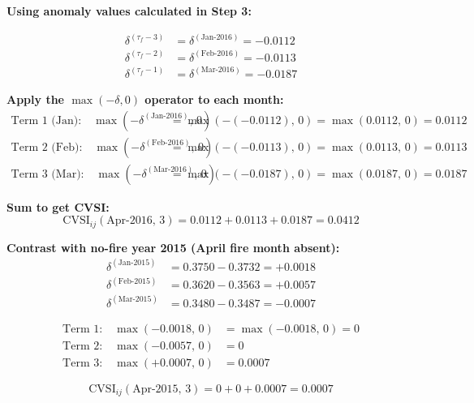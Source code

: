 \documentclass[12pt, a4paper]{article}
\begin{document}
\textbf{Using anomaly values calculated in Step 3:}

\begin{align}
\delta^{(\tau_f - 3)} &= \delta^{(\text{Jan-2016})} = -0.0112
\label{eq:d_jan16}\\
\delta^{(\tau_f - 2)} &= \delta^{(\text{Feb-2016})} = -0.0113
\label{eq:d_feb16}\\
\delta^{(\tau_f - 1)} &= \delta^{(\text{Mar-2016})} = -0.0187
\label{eq:d_mar16}
\end{align}

\textbf{Apply the $\max(-\delta, 0)$ operator to each month:}
\begin{align}
\text{Term 1 (Jan):} \quad
\max(-\delta^{(\text{Jan-2016})},\,0) &=
\max(-(-0.0112),\,0) = \max(0.0112,\,0) = \mathbf{0.0112}
\label{eq:cvsi_t1}\\[4pt]
\text{Term 2 (Feb):} \quad
\max(-\delta^{(\text{Feb-2016})},\,0) &=
\max(-(-0.0113),\,0) = \max(0.0113,\,0) = \mathbf{0.0113}
\label{eq:cvsi_t2}\\[4pt]
\text{Term 3 (Mar):} \quad
\max(-\delta^{(\text{Mar-2016})},\,0) &=
\max(-(-0.0187),\,0) = \max(0.0187,\,0) = \mathbf{0.0187}
\label{eq:cvsi_t3}
\end{align}

\textbf{Sum to get CVSI:}
\begin{equation}
  \mathrm{CVSI}_{ij}(\text{Apr-2016},\,3) =
  0.0112 + 0.0113 + 0.0187
  = \boxed{0.0412}
  \label{eq:cvsi_result}
\end{equation}

\textbf{Contrast with no-fire year 2015 (April fire month absent):}
\begin{align}
\delta^{(\text{Jan-2015})} &= 0.3750 - 0.3732 = +0.0018
\label{eq:d_jan15}\\
\delta^{(\text{Feb-2015})} &= 0.3620 - 0.3563 = +0.0057
\label{eq:d_feb15}\\
\delta^{(\text{Mar-2015})} &= 0.3480 - 0.3487 = -0.0007
\label{eq:d_mar15}
\end{align}

\begin{align}
\text{Term 1:} \quad \max(-0.0018,\,0) &= \max(-0.0018,\,0) = 0
\label{eq:cvsi15_t1}\\
\text{Term 2:} \quad \max(-0.0057,\,0) &= 0
\label{eq:cvsi15_t2}\\
\text{Term 3:} \quad \max(+0.0007,\,0) &= 0.0007
\label{eq:cvsi15_t3}
\end{align}

\begin{equation}
  \mathrm{CVSI}_{ij}(\text{Apr-2015},\,3) =
  0 + 0 + 0.0007 = \boxed{0.0007}
  \label{eq:cvsi_2015}
\end{equation}
\end{document}
